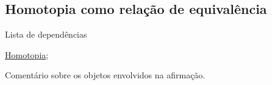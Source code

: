 \subsection{Homotopia como relação de equivalência} %
\label{homotopia-relaçao-de-equivalencia}
\begin{titlemize}{Lista de dependências}
	\item \hyperref[homotopia-def]{Homotopia};\\ %
\end{titlemize}


Comentário sobre os objetos envolvidos na afirmação.


